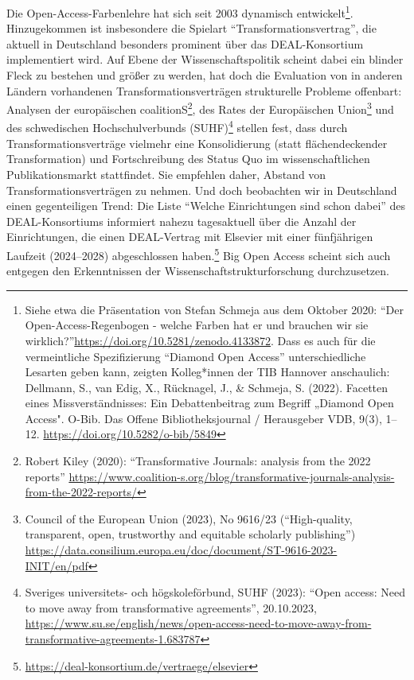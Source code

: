 \documentclass[a4paper,
fontsize=11pt,
oneside,
numbers=noperiodatend,
parskip=half-,
bibliography=totoc,
final
]{scrartcl}
\begin{document}
Die Open-Access-Farbenlehre hat sich seit 2003 dynamisch
entwickelt\footnote{Siehe etwa die Präsentation von Stefan Schmeja aus
  dem Oktober 2020: \enquote{Der Open-Access-Regenbogen - welche Farben
  hat er und brauchen wir sie
  wirklich?}\url{https://doi.org/10.5281/zenodo.4133872}. Dass es auch
  für die vermeintliche Spezifizierung \enquote{Diamond Open Access}
  unterschiedliche Lesarten geben kann, zeigten Kolleg*innen der TIB
  Hannover anschaulich: Dellmann, S., van Edig, X., Rücknagel, J., \&
  Schmeja, S. (2022). Facetten eines Missverständnisses: Ein
  Debattenbeitrag zum Begriff „Diamond Open Access". O-Bib. Das Offene
  Bibliotheksjournal / Herausgeber VDB, 9(3), 1--12.
  \url{https://doi.org/10.5282/o-bib/5849}}. Hinzugekommen ist
insbesondere die Spielart \enquote{Transformationsvertrag}, die aktuell
in Deutschland besonders prominent über das DEAL-Konsortium
implementiert wird. Auf Ebene der Wissenschaftspolitik scheint dabei ein
blinder Fleck zu bestehen und größer zu werden, hat doch die Evaluation
von in anderen Ländern vorhandenen Transformationsverträgen strukturelle
Probleme offenbart: Analysen der europäischen coalitionS\footnote{Robert
  Kiley (2020): \enquote{Transformative Journals: analysis from the 2022
  reports}
  \url{https://www.coalition-s.org/blog/transformative-journals-analysis-from-the-2022-reports/}},
des Rates der Europäischen Union\footnote{Council of the European Union
  (2023), No 9616/23 (\enquote{High-quality, transparent, open,
  trustworthy and equitable scholarly publishing})
  \url{https://data.consilium.europa.eu/doc/document/ST-9616-2023-INIT/en/pdf}}
und des schwedischen Hochschulverbunds (SUHF)\footnote{Sveriges
  universitets- och högskoleförbund, SUHF (2023): \enquote{Open access:
  Need to move away from transformative agreements}, 20.10.2023,
  \url{https://www.su.se/english/news/open-access-need-to-move-away-from-transformative-agreements-1.683787}}
stellen fest, dass durch Transformationsverträge vielmehr eine
Konsolidierung (statt flächendeckender Transformation) und
Fortschreibung des Status Quo im wissenschaftlichen Publikationsmarkt
stattfindet. Sie empfehlen daher, Abstand von Transformationsverträgen
zu nehmen. Und doch beobachten wir in Deutschland einen gegenteiligen
Trend: Die Liste \enquote{Welche Einrichtungen sind schon dabei} des
DEAL-Konsortiums informiert nahezu tagesaktuell über die Anzahl der
Einrichtungen, die einen DEAL-Vertrag mit Elsevier mit einer
fünfjährigen Laufzeit (2024--2028) abgeschlossen haben.\footnote{\url{https://deal-konsortium.de/vertraege/elsevier}}
Big Open Access scheint sich auch entgegen den Erkenntnissen der
Wissenschaftstrukturforschung durchzusetzen.
\end{document}

